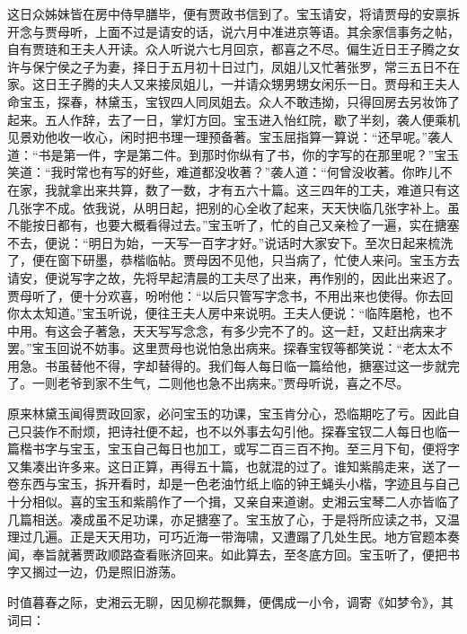 \begin{parag}
    这日众姊妹皆在房中侍早膳毕，便有贾政书信到了。宝玉请安，将请贾母的安禀拆开念与贾母听，上面不过是请安的话，说六月中准进京等语。其余家信事务之帖，自有贾琏和王夫人开读。众人听说六七月回京，都喜之不尽。偏生近日王子腾之女许与保宁侯之子为妻，择日于五月初十日过门，凤姐儿又忙著张罗，常三五日不在家。这日王子腾的夫人又来接凤姐儿，一并请众甥男甥女闲乐一日。贾母和王夫人命宝玉，探春，林黛玉，宝钗四人同凤姐去。众人不敢违拗，只得回房去另妆饰了起来。五人作辞，去了一日，掌灯方回。宝玉进入怡红院，歇了半刻，袭人便乘机见景劝他收一收心，闲时把书理一理预备著。宝玉屈指算一算说：“还早呢。”袭人道：“书是第一件，字是第二件。到那时你纵有了书，你的字写的在那里呢？”宝玉笑道：“我时常也有写的好些，难道都没收著？”袭人道：“何曾没收著。你昨儿不在家，我就拿出来共算，数了一数，才有五六十篇。这三四年的工夫，难道只有这几张字不成。依我说，从明日起，把别的心全收了起来，天天快临几张字补上。虽不能按日都有，也要大概看得过去。”宝玉听了，忙的自己又亲检了一遍，实在搪塞不去，便说：“明日为始，一天写一百字才好。”说话时大家安下。至次日起来梳洗了，便在窗下研墨，恭楷临帖。贾母因不见他，只当病了，忙使人来问。宝玉方去请安，便说写字之故，先将早起清晨的工夫尽了出来，再作别的，因此出来迟了。贾母听了，便十分欢喜，吩咐他：“以后只管写字念书，不用出来也使得。你去回你太太知道。”宝玉听说，便往王夫人房中来说明。王夫人便说：“临阵磨枪，也不中用。有这会子著急，天天写写念念，有多少完不了的。这一赶，又赶出病来才罢。”宝玉回说不妨事。这里贾母也说怕急出病来。探春宝钗等都笑说：“老太太不用急。书虽替他不得，字却替得的。我们每人每日临一篇给他，搪塞过这一步就完了。一则老爷到家不生气，二则他也急不出病来。”贾母听说，喜之不尽。
\end{parag}


\begin{parag}
    原来林黛玉闻得贾政回家，必问宝玉的功课，宝玉肯分心，恐临期吃了亏。因此自己只装作不耐烦，把诗社便不起，也不以外事去勾引他。探春宝钗二人每日也临一篇楷书字与宝玉，宝玉自己每日也加工，或写二百三百不拘。至三月下旬，便将字又集凑出许多来。这日正算，再得五十篇，也就混的过了。谁知紫鹃走来，送了一卷东西与宝玉，拆开看时，却是一色老油竹纸上临的钟王蝇头小楷，字迹且与自己十分相似。喜的宝玉和紫鹃作了一个揖，又亲自来道谢。史湘云宝琴二人亦皆临了几篇相送。凑成虽不足功课，亦足搪塞了。宝玉放了心，于是将所应读之书，又温理过几遍。正是天天用功，可巧近海一带海啸，又遭蹋了几处生民。地方官题本奏闻，奉旨就著贾政顺路查看账济回来。如此算去，至冬底方回。宝玉听了，便把书字又搁过一边，仍是照旧游荡。
\end{parag}


\begin{parag}
    时值暮春之际，史湘云无聊，因见柳花飘舞，便偶成一小令，调寄《如梦令》，其词曰：
\end{parag}


